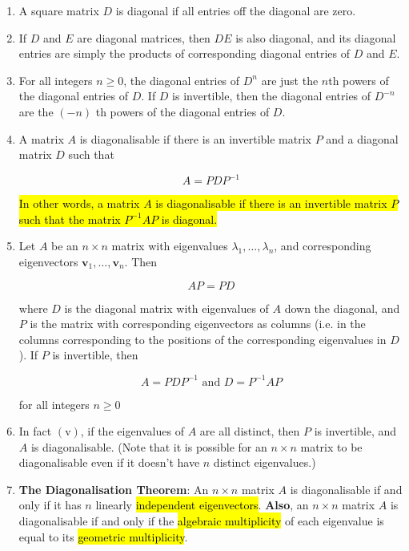 \documentclass[10pt]{article}
\begin{document}
\begin{enumerate}
\item A square matrix $D$ is diagonal if all entries off the diagonal are zero.

\item If $D$ and $E$ are diagonal matrices, then $D E$ is also diagonal, and its diagonal entries are simply the products of corresponding diagonal entries of $D$ and $E$.

\item For all integers $n \geq 0$, the diagonal entries of $D^{n}$ are just the $n$th powers of the diagonal entries of $D$. If $D$ is invertible, then the diagonal entries of $D^{-n}$ are the $(-n)$ th powers of the diagonal entries of $D$.

\item A matrix $A$ is diagonalisable if there is an invertible matrix $P$ and a diagonal matrix $D$ such that

$$
A=P D P^{-1}
$$

\hl{In other words, a matrix $A$ is diagonalisable if there is an invertible matrix $P$ such that the matrix $P^{-1} A P$ is diagonal.}

\item Let $A$ be an $n \times n$ matrix with eigenvalues $\lambda_{1}, \ldots, \lambda_{n}$, and corresponding eigenvectors $\mathbf{v}_{1}, \ldots, \mathbf{v}_{n}$. Then

$$
A P=P D
$$

where $D$ is the diagonal matrix with eigenvalues of $A$ down the diagonal, and $P$ is the matrix with corresponding eigenvectors as columns (i.e. in the columns corresponding to the positions of the corresponding eigenvalues in $D$ ). If $P$ is invertible, then

$$
A=P D P^{-1} \text { and } D=P^{-1} A P
$$

for all integers $n \geq 0$

\item In fact $(\mathrm{v})$, if the eigenvalues of $A$ are all distinct, then $P$ is invertible, and $A$ is diagonalisable. (Note that it is possible for an $n \times n$ matrix to be diagonalisable even if it doesn't have $n$ distinct eigenvalues.)

\item \textbf{The Diagonalisation Theorem}: An $n \times n$ matrix $A$ is diagonalisable if and only if it has $n$ linearly \hl{independent eigenvectors}. \textbf{Also}, an $n \times n$ matrix $A$ is diagonalisable if and only if the \hl{algebraic multiplicity} of each eigenvalue is equal to its \hl{geometric multiplicity}.


\end{enumerate}
\end{document}
